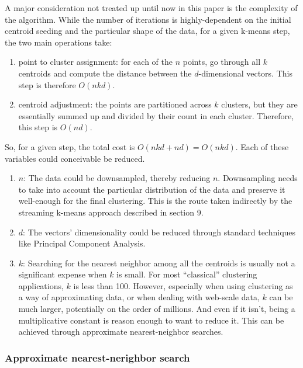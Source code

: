 \documentclass{article}
\begin{document}
A major consideration not treated up until now in this paper is the complexity of
the algorithm. While the number of iterations is highly-dependent on the
initial centroid seeding and the particular shape of the data, for a given
k-means step, the two main operations take:
\begin{enumerate}
    \item point to cluster assignment: for each of the $n$ points, go through
        all $k$ centroids and compute the distance between the $d$-dimensional
        vectors. This step is therefore $O(n k d)$.
    \item centroid adjustment: the points are partitioned across $k$ clusters,
        but they are essentially summed up and divided by their count in each
        cluster. Therefore, this step is $O(n d)$.
\end{enumerate}

So, for a given step, the total cost is $O(n k d + nd) = O(n k d)$. Each of
these variables could conceivable be reduced.

\begin{enumerate}
    \item $n$: The data could be downsampled, thereby reducing
        $n$.  Downsampling needs to take into account the particular distribution 
        of the data and preserve it well-enough for
        the final clustering. This is the route taken indirectly by the
        streaming k-means approach described in section 9.
    \item $d$: The vectors' dimensionality could be reduced through standard
        techniques like Principal Component Analysis.
    \item $k$: Searching for the nearest neighbor among all the centroids is
        usually not a significant expense when $k$ is small. For most
        ``classical'' clustering applications, $k$ is less than 100. However,
        especially when using clustering as a way of approximating data, or
        when dealing with web-scale data, $k$ can be much larger, potentially
        on the order of millions. And even if it isn't, being a multiplicative
        constant is reason enough to want to reduce it.
        This can be achieved through approximate nearest-neighbor searches.
\end{enumerate}

\subsubsection{Approximate nearest-nerighbor search}
\end{document}
